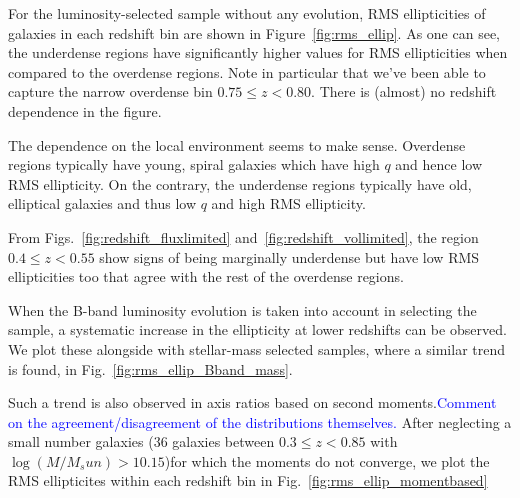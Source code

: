 \documentclass[twocolumn,useAMS,usenatbib]{mn2e}
\newcommand{\arun}[1]{{\textcolor{blue}{#1}}}
\begin{document}
For the luminosity-selected sample without any evolution, RMS ellipticities of galaxies in each redshift bin are shown in Figure~\ref{fig:rms_ellip}. As one can see, the underdense regions
have significantly higher values for RMS ellipticities when compared to the overdense regions. Note in particular that we've been able to capture the narrow overdense bin $0.75\le z < 0.80$.  
There is (almost) no redshift dependence in the figure.

The dependence on the local environment seems to make sense. Overdense regions typically have young, spiral galaxies which have high $q$ and hence low RMS ellipticity. 
On the contrary, the underdense regions typically have old, elliptical galaxies and thus low $q$ and high RMS ellipticity.

From Figs.~\ref{fig:redshift_fluxlimited} and~\ref{fig:redshift_vollimited},
the region $0.4\le z < 0.55$ show signs of being marginally underdense but have low RMS ellipticities too that agree with the rest of the overdense regions.

When the B-band luminosity evolution is taken into account in selecting the sample, a systematic increase in the ellipticity at lower redshifts can be observed. We plot these alongside with stellar-mass selected samples, where a similar trend is found, in Fig.~\ref{fig:rms_ellip_Bband_mass}. 

Such a trend is also observed in axis ratios based on second moments.\arun{Comment on the agreement/disagreement of the distributions themselves.} After neglecting a small number galaxies (36 galaxies between $0.3\le z<0.85$ with $\log(M/M_sun) > 10.15$)for which the moments do not converge, 
we plot the RMS ellipticites within each redshift bin in Fig.~\ref{fig:rms_ellip_momentbased}
\end{document}

